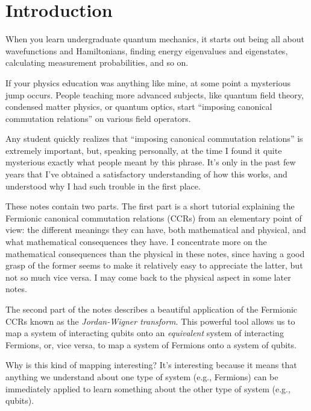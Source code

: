 \documentclass[12pt]{article}
\begin{document}


\section{Introduction}

When you learn undergraduate quantum mechanics, it starts out being
all about wavefunctions and Hamiltonians, finding energy eigenvalues
and eigenstates, calculating measurement probabilities, and so on.

If your physics education was anything like mine, at some point a
mysterious jump occurs.  People teaching more advanced subjects, like
quantum field theory, condensed matter physics, or quantum optics,
start ``imposing canonical commutation relations'' on various field
operators.

Any student quickly realizes that ``imposing canonical commutation
relations'' is extremely important, but, speaking personally, at the
time I found it quite mysterious exactly what people meant by this
phrase.  It's only in the past few years that I've obtained a
satisfactory understanding of how this works, and understood why I had
such trouble in the first place.

These notes contain two parts.  The first part is a short tutorial
explaining the Fermionic canonical commutation relations (CCRs) from
an elementary point of view: the different meanings they can have,
both mathematical and physical, and what mathematical consequences
they have.  I concentrate more on the mathematical consequences than
the physical in these notes, since having a good grasp of the former
seems to make it relatively easy to appreciate the latter, but not so
much vice versa.  I may come back to the physical aspect in some later
notes.

The second part of the notes describes a beautiful application of the
Fermionic CCRs known as the \emph{Jordan-Wigner transform}.  This
powerful tool allows us to map a system of interacting qubits onto an
\emph{equivalent} system of interacting Fermions, or, vice versa, to
map a system of Fermions onto a system of qubits.

Why is this kind of mapping interesting?  It's interesting because it
means that anything we understand about one type of system (e.g.,
Fermions) can be immediately applied to learn something about the
other type of system (e.g., qubits).
\end{document}
